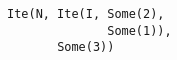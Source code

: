 \begin{lstlisting}[style=reclojureScala]
Ite(N, Ite(I, Some(2),
              Some(1)),
       Some(3))
\end{lstlisting}

